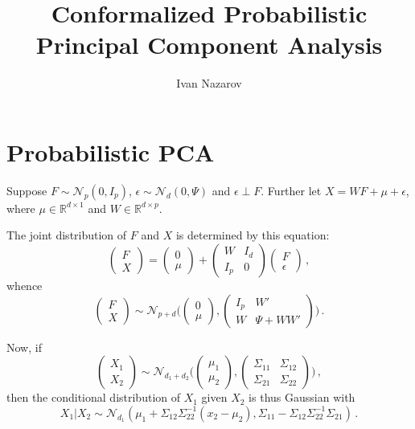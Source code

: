 \documentclass[a4paper,14pt]{article}
\title{Conformalized Probabilistic Principal Component Analysis}
\author{Ivan Nazarov}
\newcommand{\Real}{\mathbb{R}}
\begin{document}
\maketitle
\tableofcontents

\section{Probabilistic PCA} %
\label{sec:probabilistic_pca}

\noindent Suppose $F\sim\mathcal{N}_p(0, I_p)$, $\epsilon\sim\mathcal{N}_d(0, \Psi)$
and $\epsilon\perp F$. Further let $X = W F + \mu + \epsilon$, where
$\mu \in \Real^{d\times 1}$ and $W\in\Real^{d\times p}$.

The joint distribution of $F$ and $X$ is determined by this equation:
$$ \begin{pmatrix} F \\ X \end{pmatrix}
    = \begin{pmatrix} 0 \\ \mu \end{pmatrix}
    + \begin{pmatrix} W & I_d \\ I_p & 0 \end{pmatrix}
      \begin{pmatrix} F \\ \epsilon \end{pmatrix}
    \,,$$
whence
$$ \begin{pmatrix} F \\ X \end{pmatrix}
    \sim \mathcal{N}_{p+d}\Biggl(\begin{pmatrix} 0 \\ \mu \end{pmatrix},
                                 \begin{pmatrix} I_p & W' \\ W & \Psi + WW' \end{pmatrix}
                          \Biggr)
    \,.$$

Now, if
$$ \begin{pmatrix}X_1\\X_2\end{pmatrix}
    \sim \mathcal{N}_{d_1+d_2}\Biggl(\begin{pmatrix} \mu_1 \\ \mu_2 \end{pmatrix},
                                     \begin{pmatrix} \Sigma_{11} & \Sigma_{12} \\
                                                     \Sigma_{21} & \Sigma_{22} \end{pmatrix}
                              \Biggr)
    \,,$$
then the conditional distribution of $X_1$ given $X_2$ is thus Gaussian with 
$$ X_1|X_2
    \sim \mathcal{N}_{d_1}(\mu_1 + \Sigma_{12}\Sigma_{22}^{-1}(x_2-\mu_2),
                           \Sigma_{11} - \Sigma_{12}\Sigma_{22}^{-1}\Sigma_{21})
    \,.$$
\end{document}

